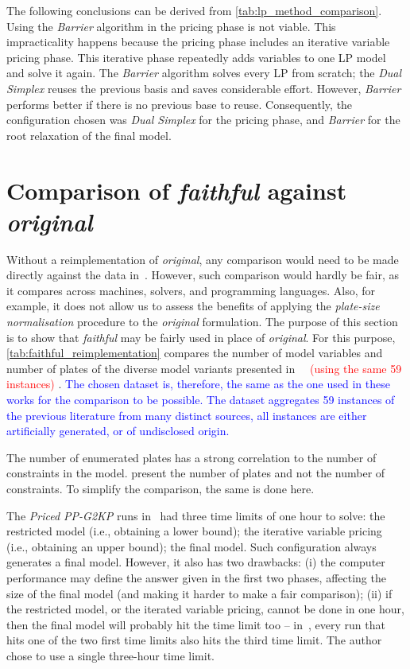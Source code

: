 \documentclass[ppgc,tese,english,formais,babel]{iiufrgs}
\newif\iffinalversion
\newcommand{\newtext}[1]{\iffinalversion%
#1%
\else%
\textcolor{blue}{#1}%
\fi%
}
\newcommand{\oldtext}[1]{\iffinalversion%
\else%
\textcolor{red}{#1}%
\fi%
}
\begin{document}
The following conclusions can be derived from \cref{tab:lp_method_comparison}.
Using the \emph{Barrier} algorithm in the pricing phase is not viable.
This impracticality happens because the pricing phase includes an iterative variable pricing phase.
This iterative phase repeatedly adds variables to one LP model and solve it again.
The \emph{Barrier} algorithm solves every LP from scratch;
the \emph{Dual Simplex} reuses the previous basis and saves considerable effort.
However, \emph{Barrier} performs better if there is no previous base to reuse.
Consequently, the configuration chosen was \emph{Dual Simplex} for the pricing phase, and \emph{Barrier} for the root relaxation of the final model.

\section{Comparison of \emph{faithful} against \emph{original}}
\label{sec:faithful_reimplementation}

Without a reimplementation of \emph{original}, any comparison would need to be made directly against the data in~\citet{dimitri_thesis}.
However, such comparison would hardly be fair, as it compares across machines, solvers, and programming languages.
Also, for example, it does not allow us to assess the benefits of applying the \emph{plate-size normalisation} procedure to the \emph{original} formulation.
The purpose of this section is to show that \emph{faithful} may be fairly used in place of \emph{original}.
For this purpose, \cref{tab:faithful_reimplementation} compares the number of model variables and number of plates of the diverse model variants presented in~\citet{dimitri_thesis}\oldtext{~(using the same 59 instances)}.
\newtext{The chosen dataset is, therefore, the same as the one used in these works for the comparison to be possible. The dataset aggregates 59 instances of the previous literature from many distinct sources, all instances are either artificially generated, or of undisclosed origin.}
The number of enumerated plates has a strong correlation to the number of constraints in the model.
\citet{dimitri_thesis} present the number of plates and not the number of constraints.
To simplify the comparison, the same is done here.

The \emph{Priced PP-G2KP} runs in~\citet{dimitri_thesis} had three time limits of one hour to solve: the restricted model (i.e., obtaining a lower bound); the iterative variable pricing (i.e., obtaining an upper bound); the final model.
Such configuration always generates a final model.
However, it also has two drawbacks:
(i) the computer performance may define the answer given in the first two phases, affecting the size of the final model (and making it harder to make a fair comparison);
(ii) if the restricted model, or the iterated variable pricing, cannot be done in one hour, then the final model will probably hit the time limit too -- in~\citet{dimitri_thesis}, every run that hits one of the two first time limits also hits the third time limit.
The author chose to use a single three-hour time limit.
\end{document}
